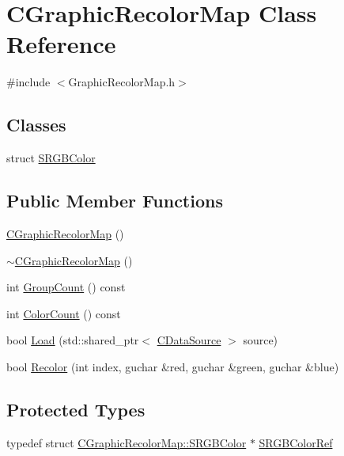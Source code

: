 \hypertarget{classCGraphicRecolorMap}{}\section{C\+Graphic\+Recolor\+Map Class Reference}
\label{classCGraphicRecolorMap}


{\ttfamily \#include $<$Graphic\+Recolor\+Map.\+h$>$}

\subsection*{Classes}
\begin{DoxyCompactItemize}
\item 
struct \hyperlink{structCGraphicRecolorMap_1_1SRGBColor}{S\+R\+G\+B\+Color}
\end{DoxyCompactItemize}
\subsection*{Public Member Functions}
\begin{DoxyCompactItemize}
\item 
\hyperlink{classCGraphicRecolorMap_a448553601e8405dc915e4e6b4f56b8c7}{C\+Graphic\+Recolor\+Map} ()
\item 
\hyperlink{classCGraphicRecolorMap_a74252a2b353bb46a757319c43a61ccfb}{$\sim$\+C\+Graphic\+Recolor\+Map} ()
\item 
int \hyperlink{classCGraphicRecolorMap_a326b3f7b5ba379e2ccc07ffeb1eb69ca}{Group\+Count} () const
\item 
int \hyperlink{classCGraphicRecolorMap_a62215bd2082304dc710d0f63af9c9906}{Color\+Count} () const
\item 
bool \hyperlink{classCGraphicRecolorMap_a71b26547c2e943036278611d048afdfb}{Load} (std\+::shared\+\_\+ptr$<$ \hyperlink{classCDataSource}{C\+Data\+Source} $>$ source)
\item 
bool \hyperlink{classCGraphicRecolorMap_a338087373145b89a29902b50276358d1}{Recolor} (int index, guchar \&red, guchar \&green, guchar \&blue)
\end{DoxyCompactItemize}
\subsection*{Protected Types}
\begin{DoxyCompactItemize}
\item 
typedef struct \hyperlink{structCGraphicRecolorMap_1_1SRGBColor}{C\+Graphic\+Recolor\+Map\+::\+S\+R\+G\+B\+Color} $\ast$ \hyperlink{classCGraphicRecolorMap_a0d6a510563b75b7dfe5f97db2cdeb2c2}{S\+R\+G\+B\+Color\+Ref}
\end{DoxyCompactItemize}
